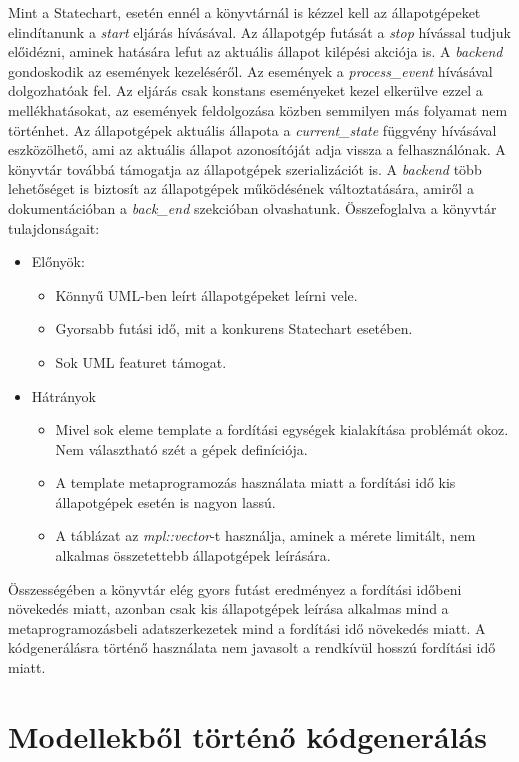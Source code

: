 \documentclass[a4paper,12pt]{report}
\begin{document}
Mint a Statechart, esetén ennél a könyvtárnál is kézzel kell az állapotgépeket elindítanunk a {\it start} eljárás hívásával. Az állapotgép futását a {\it stop} hívással tudjuk előidézni, aminek hatására lefut az aktuális állapot kilépési akciója is. A {\it backend} gondoskodik az események kezeléséről. Az események a {\it process\_event} hívásával dolgozhatóak fel. Az eljárás csak konstans eseményeket kezel elkerülve ezzel a mellékhatásokat, az események feldolgozása közben semmilyen más folyamat nem történhet. Az állapotgépek aktuális állapota a {\it current\_state} függvény hívásával eszközölhető, ami az aktuális állapot azonosítóját adja vissza a felhasználónak. A könyvtár továbbá támogatja az állapotgépek szerializációt is. A {\it backend} több lehetőséget is biztosít az állapotgépek működésének változtatására, amiről a dokumentációban a {\it back\_end} szekcióban olvashatunk.
Összefoglalva a könyvtár tulajdonságait:
\begin{itemize}
\item Előnyök:
\begin{itemize}
\item Könnyű UML-ben leírt állapotgépeket leírni vele.
\item Gyorsabb futási idő, mit a konkurens Statechart esetében.
\item Sok UML featuret támogat.
\end{itemize}
\item Hátrányok
\begin{itemize}
\item Mivel sok eleme template a fordítási egységek kialakítása problémát okoz. Nem választható szét a gépek definíciója.
\item A template metaprogramozás használata miatt a fordítási idő kis állapotgépek esetén is nagyon lassú.
\item A táblázat az {\it mpl::vector}-t használja, aminek a mérete limitált, nem alkalmas összetettebb állapotgépek leírására.%
\end{itemize}
\end{itemize}

Összességében a könyvtár elég gyors futást eredményez a fordítási időbeni növekedés miatt, azonban csak kis állapotgépek leírása alkalmas mind a metaprogramozásbeli adatszerkezetek mind a fordítási idő növekedés miatt. A kódgenerálásra történő használata nem javasolt a rendkívül hosszú fordítási idő miatt.

\chapter{Modellekből történő kódgenerálás}
\end{document}
